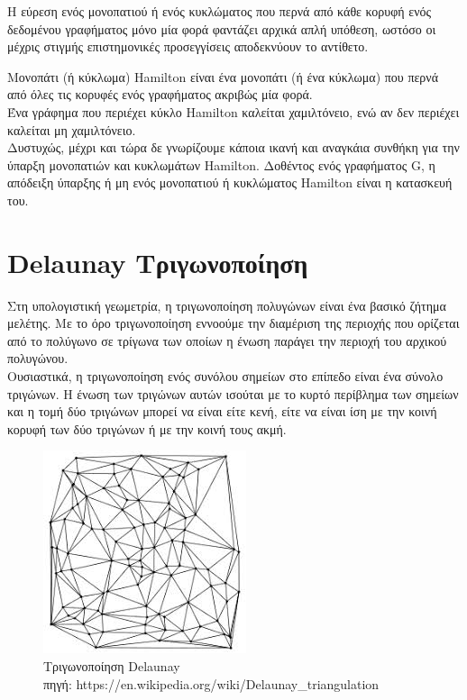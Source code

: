 \documentclass[oneside,12pt]{book}
\newenvironment{matlab}
	{\begin{figure}[hp]\centering\captionsetup{justification=centering}}
	{\end{figure}}
\theoremstyle{definition}
\begin{document}
Η εύρεση ενός μονοπατιού ή ενός κυκλώματος που περνά από κάθε κορυφή ενός δεδομένου γραφήματος μόνο μία φορά φαντάζει αρχικά απλή υπόθεση, ωστόσο οι μέχρις στιγμής επιστημονικές προσεγγίσεις αποδεκνύουν το αντίθετο. 

Μονοπάτι (ή κύκλωμα) Hamilton είναι ένα μονοπάτι (ή ένα κύκλωμα) που περνά από όλες τις κορυφές ενός γραφήματος ακριβώς μία φορά. \\

Ένα γράφημα που περιέχει κύκλο Hamilton καλείται χαμιλτόνειο, ενώ αν δεν περιέχει καλείται μη χαμιλτόνειο. \\

Δυστυχώς, μέχρι και τώρα δε γνωρίζουμε κάποια ικανή και αναγκάια συνθήκη για την ύπαρξη μονοπατιών και κυκλωμάτων Hamilton. Δοθέντος ενός γραφήματος G, η απόδειξη ύπαρξης ή μη ενός μονοπατιού ή κυκλώματος Hamilton είναι η κατασκευή του. \\ 

\section{Delaunay Τριγωνοποίηση}

Στη υπολογιστική γεωμετρία, η τριγωνοποίηση πολυγώνων είναι ένα βασικό ζήτημα μελέτης. Με το όρο τριγωνοποίηση εννοούμε την διαμέριση της περιοχής που ορίζεται από το πολύγωνο σε τρίγωνα των οποίων η ένωση παράγει την περιοχή του αρχικού πολυγώνου. \\

Ουσιαστικά, η τριγωνοποίηση ενός συνόλου σημείων στο επίπεδο είναι ένα σύνολο τριγώνων. Η ένωση των τριγώνων αυτών ισούται με το κυρτό περίβλημα των σημείων και η τομή δύο τριγώνων μπορεί να είναι είτε κενή, είτε να είναι ίση με την κοινή κορυφή των δύο τριγώνων ή με την κοινή τους ακμή.

\begin{matlab}
	\includegraphics[scale=0.9]{images/delaunay_trianglulation.jpeg}
	\caption{Τριγωνοποίηση Delaunay \\ πηγή: https://en.wikipedia.org/wiki/Delaunay\_triangulation}
\end{matlab}
\end{document}
